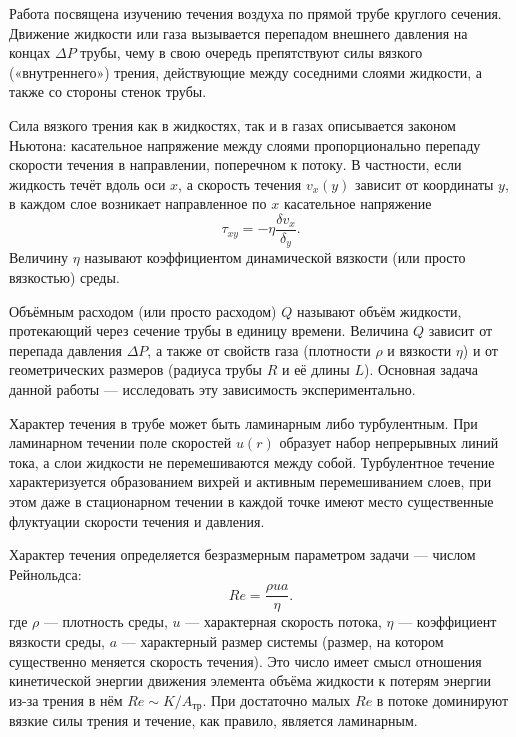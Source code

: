 \documentclass[a4paper, 12pt]{article}
\begin{document}
\par Работа посвящена изучению течения воздуха по прямой трубе круглого сечения. Движение жидкости или газа вызывается перепадом внешнего давления на концах $\Delta{P}$ трубы, чему в свою очередь препятствуют силы вязкого
(«внутреннего») трения, действующие между соседними слоями жидкости, а
также со стороны стенок трубы.
\par Сила вязкого трения как в жидкостях, так и в газах описывается законом
Ньютона: касательное напряжение между слоями пропорционально перепаду
скорости течения в направлении, поперечном к потоку. В частности, если жидкость течёт вдоль оси $x$, а скорость течения $v_x(y)$ зависит от координаты $y$, в каждом слое возникает направленное по $x$ касательное напряжение 
\begin{equation}\label{1}
\tau_{xy} = -\eta\frac{\delta{v_x}}{\delta_y}.
\end{equation}
Величину $\eta$ называют коэффициентом динамической вязкости (или просто
вязкостью) среды.
\par Объёмным расходом (или просто расходом) $Q$ называют объём жидкости,
протекающий через сечение трубы в единицу времени. Величина $Q$ зависит от
перепада давления $\Delta{P}$, а также от свойств газа (плотности $\rho$ и вязкости $\eta$) и от
геометрических размеров (радиуса трубы $R$ и её длины $L$). Основная задача
данной работы — исследовать эту зависимость экспериментально.
\par Характер течения в трубе может быть ламинарным либо турбулентным.
При ламинарном течении поле скоростей $u(r)$ образует набор непрерывных
линий тока, а слои жидкости не перемешиваются между собой. Турбулентное течение характеризуется образованием вихрей и активным перемешиванием
слоев, при этом даже в стационарном течении в каждой точке имеют место
существенные флуктуации скорости течения и давления.
\par Характер течения определяется безразмерным параметром задачи — числом Рейнольдса:
\begin{equation}\label{2}
Re = \frac{\rho{ua}}{\eta}.
\end{equation}
где $\rho$ — плотность среды, $u$ — характерная скорость потока, $\eta$ — коэффициент вязкости среды, $a$ — характерный размер системы (размер, на котором
существенно меняется скорость течения). Это число имеет смысл отношения
кинетической энергии движения элемента объёма жидкости к потерям энергии из-за трения в нём $Re \sim K/A_{\text{тр}}$. При достаточно малых $Re$ в потоке доминируют вязкие силы трения и течение, как правило, является ламинарным.
\end{document}
